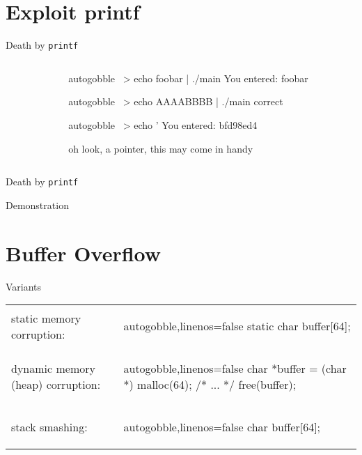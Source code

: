 \documentclass[beamer]{uibk}
\begin{document}
\section{Exploit printf}

\begin{frame}[fragile]{Death by \texttt{printf}}
    \begin{columns}
        \begin{column}{0.5\textwidth}
        \end{column}
        \begin{column}{0.5\textwidth}
            \pause
            \begin{pre*}{autogobble}
                ~> echo foobar | ./main
                You entered:
                foobar
            \end{pre*}
            \bigskip\pause
            \begin{pre*}{autogobble}
                ~> echo AAAABBBB | ./main
                correct
            \end{pre*}
            \bigskip\pause
            \begin{pre*} {autogobble}
                ~> echo '%
                You entered:
                bfd98ed4
            \end{pre*}
            \medskip
            oh look, a pointer, this may come in handy
        \end{column}
    \end{columns}
\end{frame}

\begin{frame}{Death by \texttt{printf}}
    \begin{center}
        \huge Demonstration
    \end{center}
\end{frame}

\section{Buffer Overflow}

\begin{frame}[fragile]{Variants}
    \begin{tabular}{p{} p{}}
        static memory corruption: &
        \begin{ccode*}{autogobble,linenos=false}
            static char buffer[64];
        \end{ccode*}
        \bigskip\\
        dynamic memory (heap) corruption: &
        \begin{ccode*}{autogobble,linenos=false}
            char *buffer = (char *) malloc(64);
            /* ... */
            free(buffer);
        \end{ccode*}
        \bigskip\\
        stack smashing: &
        \begin{ccode*}{autogobble,linenos=false}
            char buffer[64];
        \end{ccode*}
    \end{tabular}
\end{frame}
\end{document}
